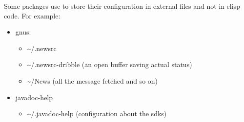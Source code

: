 \documentclass[11pt]{article}
\begin{document}
  Some packages use to store their configuration in external files and not in elisp code.
  For example:
\begin{itemize}
\item gnus:

\begin{itemize}
\item \~{}/.newsrc
\item \~{}/.newsrc-dribble (an open buffer saving actual status)
\item \~{}/News (all the message fetched and so on)
\end{itemize}

\item javadoc-help

\begin{itemize}
\item \~{}/.javadoc-help (configuration about the sdks)
\end{itemize}

\end{itemize}
      
\end{document}
